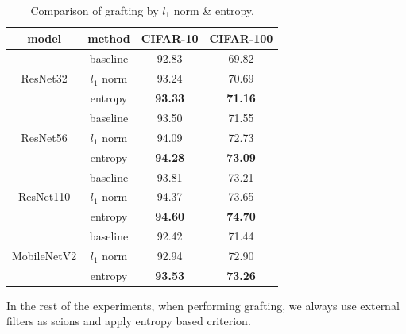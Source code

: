 \documentclass{article}
\begin{document}
\begin{table}[!h]
	\caption{Comparison of grafting by $l_{1}$ norm \& entropy. }
	\begin{center}
		\begin{tabular}{|c|c|c|c|} 
			\hline 
			model&method&CIFAR-10 &CIFAR-100\\ 
			\hline
			&baseline&92.83&69.82\\
			ResNet32&$l_{1}$ norm&93.24&70.69\\
			&entropy&\textbf{93.33}&\textbf{71.16}\\
			\hline
			&baseline&93.50&71.55\\
			ResNet56&$l_{1}$ norm&94.09&72.73\\
			&entropy&\textbf{94.28}&\textbf{73.09}\\
			\hline
			&baseline&93.81&73.21\\
			ResNet110&$l_{1}$ norm&94.37&73.65\\
			&entropy&\textbf{94.60}&\textbf{74.70}\\
			\hline
			&baseline&92.42&71.44\\
			MobileNetV2&$l_{1}$ norm&92.94&72.90\\
			&entropy&\textbf{93.53}&\textbf{73.26}\\
			\hline
		\end{tabular}
	\end{center}
	\label{table:norm_entropy}
\end{table}



In the rest of the experiments, when performing grafting, we always use external filters as scions and apply entropy based criterion.
\end{document}
